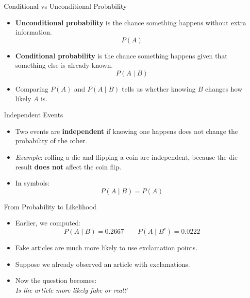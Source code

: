 \documentclass[12pt]{beamer}
\begin{document}
\begin{frame}{}
\begin{block}{Conditional vs Unconditional Probability}
\begin{itemize}
\item \textbf{Unconditional probability} is the chance something happens without extra information.
\[
P(A)
\]
\item \textbf{Conditional probability} is the chance something happens given that something else is already known.
\[
P(A \mid B)
\]
\item Comparing \(P(A)\) and \(P(A \mid B)\) tells us whether knowing \(B\) changes how likely \(A\) is.
\end{itemize}
\end{block}
\end{frame}

\begin{frame}{}
\begin{block}{Independent Events}
\begin{itemize}
\item Two events are \textbf{independent} if knowing one happens does not change the probability of the other.
\item \textcolor{aggiemaroon!70}{\emph{Example}: rolling a die and flipping a coin are independent, because the die result \textbf{does not} affect the coin flip.}
\item In symbols:
\[
P(A \mid B) = P(A)
\]
\end{itemize}
\end{block}
\end{frame}

\begin{frame}{}
\begin{block}{From Probability to Likelihood}
\begin{itemize}
\item Earlier, we computed:
\[
P(A \mid B)=0.2667
\qquad
P(A \mid B^c)=0.0222
\]
\item Fake articles are much more likely to use exclamation points.
\item Suppose we already observed an article with exclamations.
\item[] Now the question becomes:\\
  \centering \textit{Is the article more likely fake or real?}
\end{itemize}
\end{block}
\end{frame}
\end{document}
